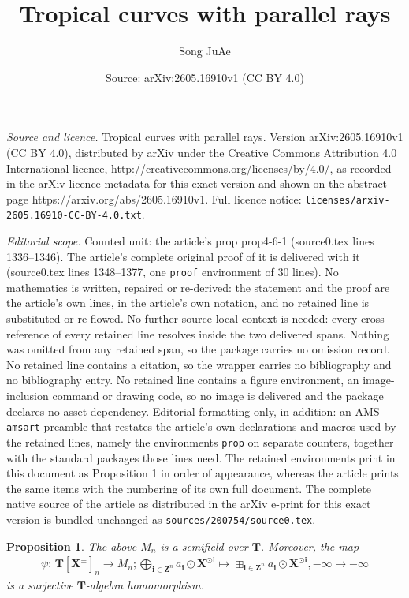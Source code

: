 \documentclass[10pt,a4paper]{amsart}
\title{Tropical curves with parallel rays}
\author{Song JuAe}
\date{Source: arXiv:2605.16910v1 (CC BY 4.0)}
\newtheorem{prop}{Proposition}
\begin{document}
\maketitle

\noindent\emph{Source and licence.} Tropical curves with parallel rays. Version arXiv:2605.16910v1 (CC BY 4.0), distributed by arXiv under the Creative Commons Attribution 4.0 International licence, http://creativecommons.org/licenses/by/4.0/, as recorded in the arXiv licence metadata for this exact version and shown on the abstract page https://arxiv.org/abs/2605.16910v1. Full licence notice: \texttt{licenses/arxiv-2605.16910-CC-BY-4.0.txt}.\par\smallskip

\noindent\textit{Editorial scope.} Counted unit: the article's prop prop4-6-1 (source0.tex lines 1336--1346). The article's complete original proof of it is delivered with it (source0.tex lines 1348--1377, one \texttt{proof} environment of 30 lines). No mathematics is written, repaired or re-derived: the statement and the proof are the article's own lines, in the article's own notation, and no retained line is substituted or re-flowed.  No further source-local context is needed: every cross-reference of every retained line resolves inside the two delivered spans.  Nothing was omitted from any retained span, so the package carries no omission record.  No retained line contains a citation, so the wrapper carries no bibliography and no bibliography entry.  No retained line contains a figure environment, an image-inclusion command or drawing code, so no image is delivered and the package declares no asset dependency.  Editorial formatting only, in addition: an AMS \texttt{amsart} preamble that restates the article's own declarations and macros used by the retained lines, namely the environments \texttt{prop} on separate counters, together with the standard packages those lines need.  The retained environments print in this document as Proposition 1 in order of appearance, whereas the article prints the same items with the numbering of its own full document.  The complete native source of the article as distributed in the arXiv e-print for this exact version is bundled unchanged as \texttt{sources/200754/source0.tex}.
\begin{prop}
    \label{prop4-6-1}
The above $M_n$ is a semifield over $\boldsymbol{T}$.
Moreover, the map
\begin{align*}
\psi :\, \boldsymbol{T}[\boldsymbol{X}^{\pm}]_n \to M_n;
\bigoplus_{\boldsymbol{i} \in \boldsymbol{Z}^n} a_{\boldsymbol{i}} \odot \boldsymbol{X}^{\odot \boldsymbol{i}} \mapsto \boxplus_{\boldsymbol{i} \in \boldsymbol{Z}^n} a_{\boldsymbol{i}} \odot \boldsymbol{X}^{\odot \boldsymbol{i}},
-\infty \mapsto -\infty
\end{align*}
is a surjective $\boldsymbol{T}$-algebra homomorphism.
\end{prop}
\end{document}
